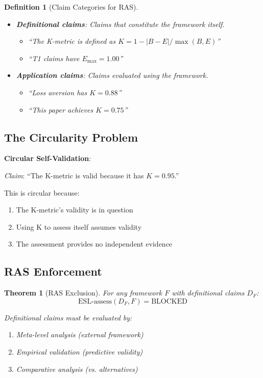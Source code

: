 \documentclass[11pt,a4paper]{article}
\newtheorem{definition}{Definition}[section]
\newtheorem{theorem}{Theorem}[section]
\theoremstyle{remark}
\begin{document}
\begin{definition}[Claim Categories for RAS]
\label{def:ras-claims}
\begin{itemize}
    \item \textbf{Definitional claims}: Claims that constitute the framework itself.
    \begin{itemize}
        \item ``The K-metric is defined as $K = 1 - |B-E|/\max(B,E)$''
        \item ``T1 claims have $E_{\max} = 1.00$''
    \end{itemize}

    \item \textbf{Application claims}: Claims evaluated using the framework.
    \begin{itemize}
        \item ``Loss aversion has $K = 0.88$''
        \item ``This paper achieves $K = 0.75$''
    \end{itemize}
\end{itemize}
\end{definition}

\subsection{The Circularity Problem}

\begin{warningbox}
\textbf{Circular Self-Validation}:

\textit{Claim}: ``The K-metric is valid because it has $K = 0.95$.''

This is circular because:
\begin{enumerate}
    \item The K-metric's validity is in question
    \item Using K to assess itself assumes validity
    \item The assessment provides no independent evidence
\end{enumerate}
\end{warningbox}

\subsection{RAS Enforcement}

\begin{theorem}[RAS Exclusion]
\label{thm:ras}
For any framework $F$ with definitional claims $D_F$:
\begin{equation}
\text{ESL-assess}(D_F, F) = \text{BLOCKED}
\end{equation}

Definitional claims must be evaluated by:
\begin{enumerate}
    \item Meta-level analysis (external framework)
    \item Empirical validation (predictive validity)
    \item Comparative analysis (vs. alternatives)
\end{enumerate}
\end{theorem}
\end{document}
